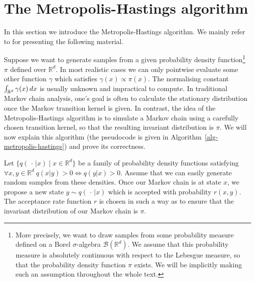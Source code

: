 \documentclass[report.tex]{subfiles}
\begin{document}
\section{The Metropolis-Hastings algorithm}

In this section we introduce the Metropolis-Hastings algorithm.
We mainly refer to \cite{liu2008monte} for presenting the following material.

Suppose we want to generate samples from a given probability density function\footnote{
  More precisely, we want to draw samples from some probability measure
  defined on a Borel $\sigma$-algebra $\mathcal{B}(\mathbb{R}^{d})$. We assume
  that this probability measure is absolutely continuous with respect to the
  Lebesgue measure, so that the probability density function $\pi$ exists.
  We will be implicitly making such an assumption throughout the whole text.
}
$\pi$ defined over $\mathbb{R}^{d}$. In most
realistic cases we can only pointwise evaluate some other function $\gamma$ which
satisfies $\gamma(x) \propto \pi(x)$.
The normalising constant
$\int_{{\mathbb{R}^{d}}}^{{}} {\gamma(x)}\, d{x}$ is usually unknown and impractical
to compute.
In traditional Markov chain analysis, one's goal is often to calculate
the stationary distribution once the Markov transition kernel is given.
In contrast, the idea of the Metropolis-Hastings algorithm is to
simulate a Markov chain using a carefully chosen transition kernel,
so that the resulting invariant distribution is $\pi$.
We will now explain this algorithm
(the pseudocode is given in Algorithm~\ref{alg-metropolis-hastings})
and prove its correctness.

Let $\{q(\,\cdot\, \vert x) \mid x \in \mathbb{R}^d\}$
be a family of probability density functions satisfying
$\forall x,y \in \mathbb{R}^{d}\ q(x \vert y) > 0 \Leftrightarrow q(y \vert x) > 0$.
Assume that we can easily generate random samples from these densities.
Once our Markov chain is at state $x$, we propose a new state
$y \sim q(\,\cdot\, \vert x)$ which is accepted with probability
$r(x, y)$. The acceptance rate function $r$ is chosen in such a way as to
ensure that the invariant distribution of our Markov chain is $\pi$.
\end{document}
